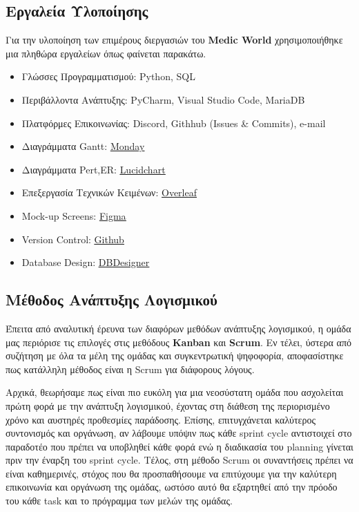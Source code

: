 \documentclass{article}
\begin{document}
\subsection{Εργαλεία Υλοποίησης}

Για την υλοποίηση των επιμέρους διεργασιών του \textbf{Medic World} χρησιμοποιήθηκε μια πληθώρα εργαλείων όπως φαίνεται παρακάτω.


\begin{itemize}
    \item Γλώσσες Προγραμματισμού: Python, SQL
    \item Περιβάλλοντα Ανάπτυξης: PyCharm, Visual Studio Code, MariaDB
    \item Πλατφόρμες Επικοινωνίας: Discord, Githhub (Issues \& Commits), e-mail
    \item Διαγράμματα Gantt: \underline{\href{https://www.monday.com}{Monday}}
    \item Διαγράμματα Pert,ER: \underline{\href{https://lucid.app}{Lucidchart}}
    \item Επεξεργασία Τεχνικών Κειμένων: \underline{\href{https://www.overleaf.com}{Overleaf}}
    \item Mock-up Screens: \underline{\href{https://www.figma.com}{Figma}}
    \item Version Control: \underline{\href{https://github.com/}{Github}}
    \item Database Design: \underline{\href{www.dbdesigner.net}{DBDesigner}}
\end{itemize}
 

\subsection{Μέθοδος Ανάπτυξης Λογισμικού}

Έπειτα από αναλυτική έρευνα των διαφόρων μεθόδων ανάπτυξης λογισμικού, η ομάδα μας περιόρισε τις επιλογές στις μεθόδους \textbf{Kanban} και \textbf{Scrum}. Εν τέλει, ύστερα από συζήτηση με όλα τα μέλη της ομάδας και συγκεντρωτική ψηφοφορία, αποφασίστηκε πως κατάλληλη μέθοδος είναι η Scrum για διάφορους λόγους. \newline \par

Αρχικά, θεωρήσαμε πως είναι πιο ευκόλη για μια νεοσύστατη ομάδα που ασχολείται πρώτη φορά με την ανάπτυξη λογισμικού, έχοντας στη διάθεση της περιορισμένο χρόνο και αυστηρές προθεσμίες παράδοσης. Επίσης, επιτυγχάνεται καλύτερος συντονισμός και οργάνωση, αν λάβουμε υπόψιν πως κάθε sprint cycle αντιστοιχεί στο παραδοτέο που πρέπει να υποβληθεί κάθε φορά ενώ η διαδικασία του planning γίνεται πριν την έναρξη του sprint cycle. Τέλος, στη μέθοδο Scrum οι συναντήσεις πρέπει να είναι καθημερινές, στόχος που θα προσπαθήσουμε να επιτύχουμε για την καλύτερη επικοινωνία και οργάνωση της ομάδας, ωστόσο αυτό θα εξαρτηθεί από την πρόοδο του κάθε task και το πρόγραμμα των μελών της ομάδας. \newline \par
\end{document}
